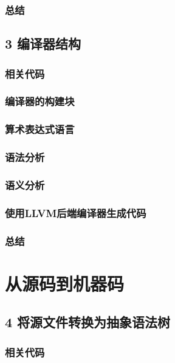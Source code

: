 \documentclass[11pt,a4paper,UTF8]{ctexart}
\begin{document}
		\subsubsection{总结}
	\subsection{3 编译器结构}
		\subsubsection{相关代码}
		\subsubsection{编译器的构建块}
		\subsubsection{算术表达式语言}
		\subsubsection{语法分析}
		\subsubsection{语义分析}
		\subsubsection{使用LLVM后端编译器生成代码}
		\subsubsection{总结}
	\section{从源码到机器码}
	\subsection{4 将源文件转换为抽象语法树}
		\subsubsection{相关代码}
\end{document}

